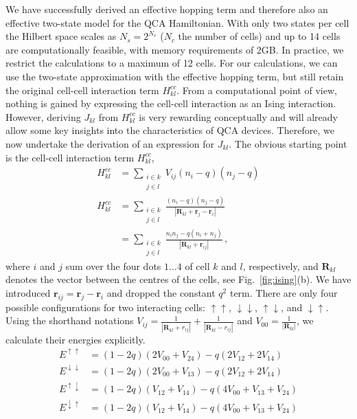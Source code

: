 We have successfully derived an effective hopping term and therefore also an
effective two-state model for the QCA Hamiltonian. With only two states per cell
the Hilbert space scales as $N_s = 2^{N_c}$ ($N_c$ the number of cells) and up
to 14 cells are computationally feasible, with memory requirements of 2GB. In
practice, we restrict the calculations to a maximum of 12 cells. For our
calculations, we can use the two-state approximation with the effective hopping
term, but still retain the original cell-cell interaction term $H^{cc}_{kl}$.
From a computational point of view, nothing is gained by expressing the
cell-cell interaction as an Ising interaction. However, deriving $J_{kl}$ from
$H^{cc}_{kl}$ is very rewarding conceptually and will already allow some key
insights into the characteristics of QCA devices. Therefore, we now undertake
the derivation of an expression for $J_{kl}$. The obvious starting point is the
cell-cell interaction term $H^{cc}_{kl}$, 
%
\begin{equation}
\begin{split}
  H^{cc}_{kl} 
  &=
  \sum_{\substack{i \in k\\j \in l}} V_{ij} \left( n_i - q \right) \left( n_j - q \right) \\
  H^{cc}_{kl}
  &= 
  \sum_{\substack{i \in k\\j \in l}}
  \frac{ \left( n_i - q \right) \left( n_j - q \right) }
       { \left| \bm{R}_{kl} + \bm{r}_j - \bm{r}_i \right| } \\
  &=
  \sum_{\substack{i \in k\\j \in l}}
  \frac{n_i n_j - q (n_i + n_j)}
       {\left| \bm{R}_{kl} + \bm{r}_{ij} \right|} \, ,
\end{split}
\end{equation}
%
where $i$ and $j$ sum over the four dots $1\ldots4$ of cell $k$ and $l$,
respectively, and $\bm{R}_{kl}$ denotes the vector between the centres of the cells,
see Fig.~\ref{fig:ising}(b). We have introduced $\bm{r}_{ij} = \bm{r}_j -
\bm{r}_i$ and dropped the constant $q^2$ term. There are only four possible
configurations for two interacting cells: $\uparrow\uparrow$,
$\downarrow\downarrow$, $\uparrow\downarrow$, and $\downarrow\uparrow$. Using
the shorthand notations $V_{ij} = \frac{1}{\left| \bm{R}_{kl} + r_{ij} \right|}
+ \frac{1}{\left| \bm{R}_{kl} - r_{ij} \right|}$ and $V_{00} = \frac{1}{\left|
\bm{R}_{kl} \right|}$, we calculate their energies explicitly.
\begin{align}
  E^{\uparrow\uparrow}
  &=
  \left( 1 - 2 q \right) \left( 2 V_{00} + V_{24} \right)
  - q \left( 2 V_{12} + 2 V_{14} \right)
  \\
  E^{\downarrow\downarrow}
  &=
  \left( 1 - 2 q \right) \left( 2 V_{00} + V_{13} \right)
  - q \left( 2 V_{12} + 2 V_{14} \right)
  \\
  E^{\uparrow\downarrow}
  &=
  \left( 1 - 2 q \right) \left( V_{12} + V_{14} \right)
  - q \left( 4 V_{00} + V_{13} + V_{24} \right)
  \\
  E^{\downarrow\uparrow}
  &=
  \left( 1 - 2 q \right) \left( V_{12} + V_{14} \right)
  - q \left( 4 V_{00} + V_{13} + V_{24} \right)
\end{align}
